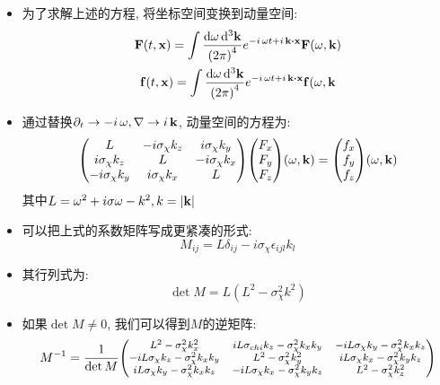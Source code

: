 \documentclass{beamer}
\begin{document}
\begin{frame}
  \begin{itemize}
  \item 为了求解上述的方程, 将坐标空间变换到动量空间:
    \begin{gather}
      \vb{F}(t,\vb{x}) = \int \frac{\dd{\omega}\dd[3]{\vb{k}}}{{(2\pi)}^4} e^{-i\,\omega t + i\,\vb{k}\vdot\vb{x}} \vb{F}(\omega, \vb{k}) \\
      \vb{f}(t,\vb{x}) = \int \frac{\dd{\omega}\dd[3]{\vb{k}}}{{(2\pi)}^4} e^{-i\,\omega t + i\,\vb{k}\vdot\vb{x}} \vb{f}(\omega, \vb{k}
    \end{gather}
  \item 通过替换$\partial_t \rightarrow -i\,\omega, \nabla \rightarrow i\,\vb{k}$, 动量空间的方程为:
    \begin{equation}
      \mqty(L & -i\sigma_{\chi}k_z & i\sigma_{\chi}k_y \\
      i\sigma_{\chi}k_z & L & -i\sigma_{\chi} k_x \\
      -i\sigma_{\chi}k_y & i\sigma_{\chi}k_x & L)
      \mqty(F_x \\ F_y \\ F_z) (\omega,\vb{k}) = \mqty(f_x \\ f_y \\ f_z)(\omega,\vb{k})
    \end{equation}
    其中$L = \omega^2 + i\sigma\omega - k^2, k = |\vb{k}|$
  \end{itemize}
\end{frame}

\begin{frame}
  \begin{itemize}
  \item 可以把上式的系数矩阵写成更紧凑的形式:
    \begin{equation}
      M_{ij} = L \delta_{ij} - i\sigma_{\chi} \epsilon_{ijl}k_l
    \end{equation}
  \item 其行列式为:
    \begin{equation}
      \det M = L(L^2 - \sigma_{\chi}^2 k^2)
    \end{equation}
  \item 如果$\det M \neq 0$, 我们可以得到$M$的逆矩阵:
    \begin{equation} \footnotesize
    M^{-1} = \frac{1}{\det M} \mqty(L^2-\sigma^2_{\chi}k^2_x & iL\sigma_{chi}k_z-\sigma^2_{\chi}k_xk_y & -iL\sigma_{\chi}k_y-\sigma^2_{\chi}k_xk_z\\
                                    -iL\sigma_{\chi}k_z-\sigma^2_{\chi}k_xk_y & L^2-\sigma^2_{\chi}k^2_y & iL\sigma_{\chi}k_x-\sigma^2_{\chi}k_yk_z\\
                                    iL\sigma_{\chi}k_y-\sigma^2_{\chi}k_xk_z & -iL\sigma_{\chi}k_x-\sigma^2_{\chi}k_yk_z & L^2-\sigma^2_{\chi}k^2_z)
    \end{equation}

  \end{itemize}
\end{frame}
\end{document}
